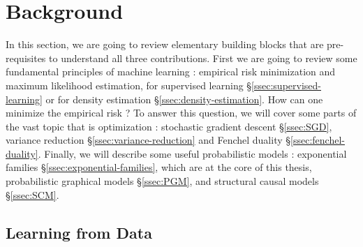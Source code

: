 \chapter{Background}
\label{ch:background}

In this section, we are going to review elementary building blocks that are pre-requisites to understand all three contributions.
First we are going to review some fundamental principles of machine learning : empirical risk minimization and maximum likelihood estimation, for supervised learning \S\ref{ssec:supervised-learning} or for density estimation \S\ref{ssec:density-estimation}.
How can one minimize the empirical risk ?  
To answer this question, we will cover some parts of the vast topic that is optimization : stochastic gradient descent \S\ref{ssec:SGD}, variance reduction \S\ref{ssec:variance-reduction} and Fenchel duality \S\ref{ssec:fenchel-duality}.
Finally, we will describe some useful probabilistic models : exponential families \S\ref{ssec:exponential-families}, which are at the core of this thesis, probabilistic graphical models \S\ref{ssec:PGM}, and  structural causal models \S\ref{ssec:SCM}.



\section{Learning from Data}

